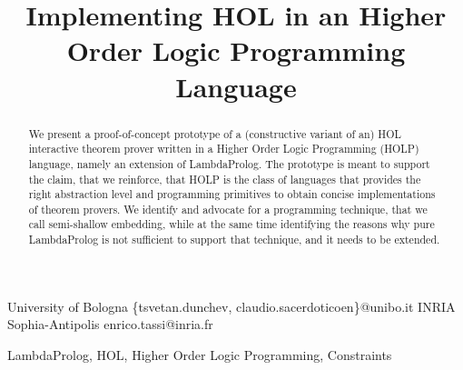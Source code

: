 \documentclass[preprint]{sigplanconf}
\begin{document}
\setlength{\pdfpageheight}{\paperheight}
\setlength{\pdfpagewidth}{\paperwidth}




\title{Implementing HOL in an Higher Order Logic Programming Language}

           {University of Bologna}
           {\{tsvetan.dunchev, claudio.sacerdoticoen\}@unibo.it}
           {INRIA Sophia-Antipolis}
           {enrico.tassi@inria.fr}

\maketitle

\begin{abstract}
We present a proof-of-concept prototype of a (constructive variant of an) HOL interactive theorem prover written in a Higher Order Logic Programming (HOLP) language, namely an extension of LambdaProlog. The prototype is meant to support the claim, that we reinforce, that HOLP is the class of languages that provides the right abstraction level and programming primitives to obtain concise implementations of theorem provers. We identify and advocate for a programming technique, that we call semi-shallow embedding, while at the same time identifying the reasons why pure LambdaProlog is not sufficient to support that technique, and it needs to be extended.
\end{abstract}



\keywords
LambdaProlog, HOL, Higher Order Logic Programming, Constraints
\end{document}
